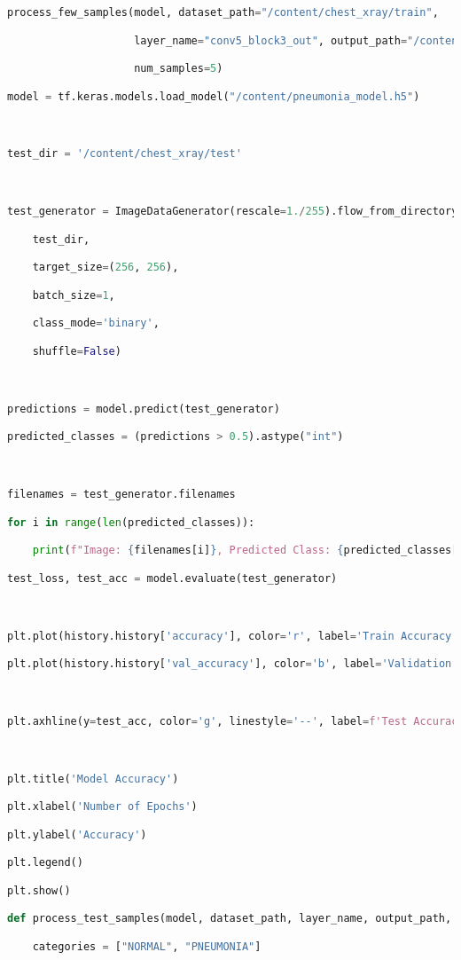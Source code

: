 \documentclass{article}
\begin{document}
\begin{lstlisting}[style=mystyle,language=Python]
process_few_samples(model, dataset_path="/content/chest_xray/train",

                    layer_name="conv5_block3_out", output_path="/content/chest_xray_gradcam",

                    num_samples=5)

model = tf.keras.models.load_model("/content/pneumonia_model.h5")



test_dir = '/content/chest_xray/test'



test_generator = ImageDataGenerator(rescale=1./255).flow_from_directory(

    test_dir,

    target_size=(256, 256),

    batch_size=1,

    class_mode='binary',

    shuffle=False)



predictions = model.predict(test_generator)

predicted_classes = (predictions > 0.5).astype("int")



filenames = test_generator.filenames

for i in range(len(predicted_classes)):

    print(f"Image: {filenames[i]}, Predicted Class: {predicted_classes[i]}")

test_loss, test_acc = model.evaluate(test_generator)



plt.plot(history.history['accuracy'], color='r', label='Train Accuracy')

plt.plot(history.history['val_accuracy'], color='b', label='Validation Accuracy')



plt.axhline(y=test_acc, color='g', linestyle='--', label=f'Test Accuracy: {test_acc:.2f}')



plt.title('Model Accuracy')

plt.xlabel('Number of Epochs')

plt.ylabel('Accuracy')

plt.legend()

plt.show()

def process_test_samples(model, dataset_path, layer_name, output_path, num_samples=5):

    categories = ["NORMAL", "PNEUMONIA"]


\end{lstlisting}
\end{document}
